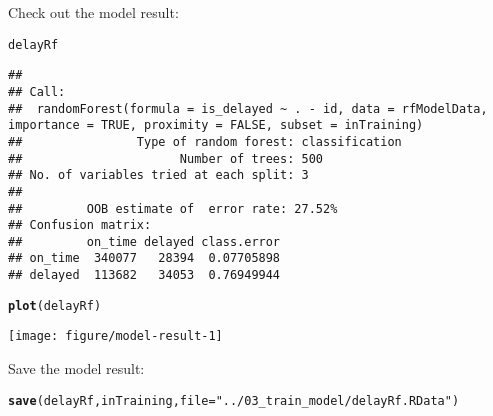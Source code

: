 \documentclass{article}\usepackage[]{graphicx}\usepackage[]{color}
\makeatletter
\def\maxwidth{ %
  \ifdim\Gin@nat@width>\linewidth
    \linewidth
  \else
    \Gin@nat@width
  \fi
}
\newcommand{\hlstr}[1]{\textcolor[rgb]{0.192,0.494,0.8}{#1}}%
\newcommand{\hlstd}[1]{\textcolor[rgb]{0.345,0.345,0.345}{#1}}%
\newcommand{\hlkwc}[1]{\textcolor[rgb]{0.333,0.667,0.333}{#1}}%
\newcommand{\hlkwd}[1]{\textcolor[rgb]{0.737,0.353,0.396}{\textbf{#1}}}%
\newenvironment{kframe}{%
 \def\at@end@of@kframe{}%
 \ifinner\ifhmode%
  \def\at@end@of@kframe{\end{minipage}}%
  \begin{minipage}{\columnwidth}%
 \fi\fi%
 \def\FrameCommand##1{\hskip\@totalleftmargin \hskip-\fboxsep
 \colorbox{shadecolor}{##1}\hskip-\fboxsep
     \hskip-\linewidth \hskip-\@totalleftmargin \hskip\columnwidth}%
 \MakeFramed {\advance\hsize-\width
   \@totalleftmargin\z@ \linewidth\hsize
   \@setminipage}}%
 {\par\unskip\endMakeFramed%
 \at@end@of@kframe}
\newenvironment{knitrout}{}{} %
\makeatother
\begin{document}




Check out the model result:
\begin{knitrout}
\color{fgcolor}\begin{kframe}
\begin{alltt}
\hlstd{delayRf}
\end{alltt}
\begin{verbatim}
## 
## Call:
##  randomForest(formula = is_delayed ~ . - id, data = rfModelData,      importance = TRUE, proximity = FALSE, subset = inTraining) 
##                Type of random forest: classification
##                      Number of trees: 500
## No. of variables tried at each split: 3
## 
##         OOB estimate of  error rate: 27.52%
## Confusion matrix:
##         on_time delayed class.error
## on_time  340077   28394  0.07705898
## delayed  113682   34053  0.76949944
\end{verbatim}
\begin{alltt}
\hlkwd{plot}\hlstd{(delayRf)}
\end{alltt}
\end{kframe}

{\centering \texttt{[image: figure/model-result-1]} 

}



\end{knitrout}

Save the model result:
\begin{knitrout}
\color{fgcolor}\begin{kframe}
\begin{alltt}
\hlkwd{save}\hlstd{(delayRf, inTraining,} \hlkwc{file}\hlstd{=}\hlstr{"../03_train_model/delayRf.RData"}\hlstd{)}
\end{alltt}
\end{kframe}
\end{knitrout}
\end{document}
